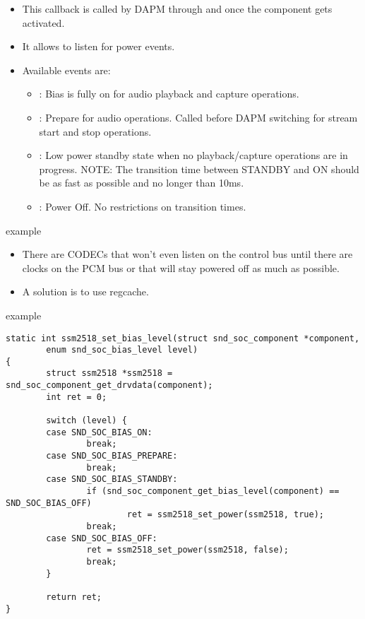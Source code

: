 \begin{frame}{}
  \begin{itemize}
  \item This callback is called by DAPM through
     and
     once the component gets
    activated.
  \item It allows to listen for power events.
  \item Available events are:
    \begin{itemize}
    \item {}: Bias is fully on for audio playback
      and capture operations.
    \item {}: Prepare for audio operations.
      Called before DAPM switching for
      stream start and stop operations.
    \item {}: Low power standby state when no
      playback/capture operations are
      in progress. NOTE: The transition time between STANDBY and ON
      should be as fast as possible and no longer than 10ms.
    \item {}: Power Off. No restrictions on
      transition times.
    \end{itemize}
  \end{itemize}
\end{frame}

\begin{frame}{ example}
  \begin{itemize}
  \item There are CODECs that won't even listen on the control
    bus until there are clocks on the PCM bus or that will stay
    powered off as much as possible.
  \item A solution is to use regcache.
  \end{itemize}
\end{frame}

\begin{frame}[fragile]{ example}
  \begin{block}{}
    \fontsize{8}{8}\selectfont
    \begin{verbatim}
static int ssm2518_set_bias_level(struct snd_soc_component *component,
        enum snd_soc_bias_level level)
{
        struct ssm2518 *ssm2518 = snd_soc_component_get_drvdata(component);
        int ret = 0;

        switch (level) {
        case SND_SOC_BIAS_ON:
                break;
        case SND_SOC_BIAS_PREPARE:
                break;
        case SND_SOC_BIAS_STANDBY:
                if (snd_soc_component_get_bias_level(component) == SND_SOC_BIAS_OFF)
                        ret = ssm2518_set_power(ssm2518, true);
                break;
        case SND_SOC_BIAS_OFF:
                ret = ssm2518_set_power(ssm2518, false);
                break;
        }

        return ret;
}
    \end{verbatim}
  \end{block}
\end{frame}

